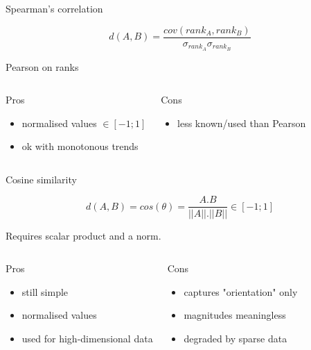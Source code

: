 \documentclass{beamer}
\begin{document}
\begin{frame}{Spearman's correlation}


$$d(A,B)= \frac{cov(rank_A, rank_B)}{\sigma_{rank_A}\sigma_{rank_B}}$$


Pearson on ranks 

\begin{scriptsize}
\begin{columns}[T,onlytextwidth]
\begin{block}{Pros}
\begin{itemize}
  \item normalised values $\in [-1;1]$
  \item ok with monotonous trends
\end{itemize}
\end{block}
\begin{block}{Cons}
\begin{spacing}{0.9}
\begin{itemize}
  \item less known/used than Pearson 
  \end{itemize}
\end{spacing}
\end{block}
\end{columns}
\end{scriptsize}

\end{frame}




\begin{frame}{Cosine similarity}

$$d(A,B)= cos(\theta)= \frac{A.B}{||A||.||B||} \in[-1;1]$$

Requires \alert{scalar product}  and a \alert{norm}.


\begin{scriptsize}
\begin{columns}[T,onlytextwidth]
\begin{block}{Pros}
\begin{itemize}
  \item still simple
  \item normalised values
  \item used for high-dimensional data
\end{itemize}
\end{block}
\begin{block}{Cons}
\begin{spacing}{0.9}
\begin{itemize}
  \item captures "orientation" only
  \item magnitudes  meaningless
  \item degraded by sparse data 
\end{itemize}
\end{spacing}
\end{block}
\end{columns}
\end{scriptsize}



\end{frame}
\end{document}
